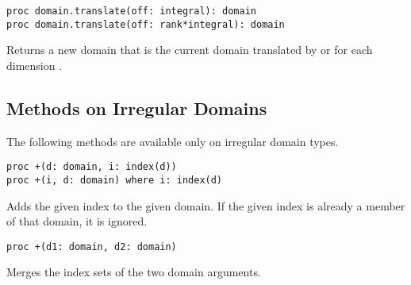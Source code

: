 \begin{protohead}
\begin{verbatim}
proc domain.translate(off: integral): domain
proc domain.translate(off: rank*integral): domain
\end{verbatim}
\end{protohead}
\begin{protobody}
Returns a new domain that is the current domain translated
by  or  for each dimension .
\end{protobody}


\subsection{Methods on Irregular Domains}

The following methods are available only on irregular domain types.

\begin{protohead}
\begin{verbatim}
proc +(d: domain, i: index(d))
proc +(i, d: domain) where i: index(d)
\end{verbatim}
\end{protohead}
\begin{protobody}
Adds the given index to the given domain.  If the given index is already a
member of that domain, it is ignored.
\end{protobody}

\begin{protohead}
\begin{verbatim}
proc +(d1: domain, d2: domain)
\end{verbatim}
\end{protohead}
\begin{protobody}
Merges the index sets of the two domain arguments.
\end{protobody}

